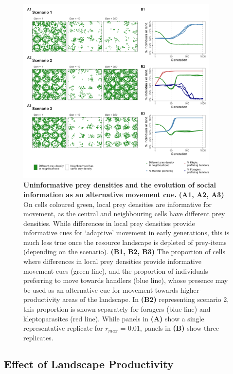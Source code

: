 \begin{figure}[t!]
    \centering
    \includegraphics[width=0.9\textwidth]{figures/kleptomove/fig_05.png}
    \caption{
        \textbf{Uninformative prey densities and the evolution of social information as an alternative movement cue.}
        \textbf{(A1, A2, A3)} On cells coloured green, local prey densities are informative for movement, as the central and neighbouring cells have different prey densities.
        While differences in local prey densities provide informative cues for `adaptive' movement in early generations, this is much less true once the resource landscape is depleted of prey-items (depending on the scenario).
        \textbf{(B1, B2, B3)} The proportion of cells where differences in local prey densities provide informative movement cues (green line), and the proportion of individuals preferring to move towards handlers (blue line), whose presence may be used as an alternative cue for movement towards higher-productivity areas of the landscape.
        In \textbf{(B2)} representing scenario 2, this proportion is shown separately for foragers (blue line) and kleptoparasites (red line).
        While panels in \textbf{(A)} show a single representative replicate for $r_{max}$ = 0.01, panels in \textbf{(B)} show three replicates.
    }
    \label{klepto_fig_05}
\end{figure}

\subsection*{Effect of Landscape Productivity}

